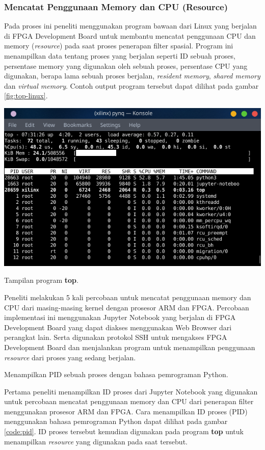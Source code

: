 \subsubsection{Mencatat Penggunaan Memory dan CPU (Resource)}
Pada proses ini peneliti menggunakan program bawaan dari Linux yang berjalan di FPGA Development Board untuk membantu mencatat penggunaan CPU dan memory (\textit{resource}) pada saat proses penerapan filter spasial. Program ini menampilkan data tentang proses yang berjalan seperti ID sebuah proses, persentase memory yang digunakan oleh sebuah proses, persentase CPU yang digunakan, berapa lama sebuah proses berjalan, \textit{resident memory}, \textit{shared memory} dan \textit{virtual memory}. Contoh output program tersebut dapat dilihat pada gambar \ref{fig:top-linux}.
\begin{afigure}
    \includegraphics[width=0.8\linewidth, center]{images/programs/top-linux.png}
    \caption{Tampilan program \textbf{top}.}
    \label{fig:top-linux}
\end{afigure}

Peneliti melakukan 5 kali percobaan untuk mencatat penggunaan memory dan CPU dari masing-masing kernel dengan prosesor ARM dan FPGA. Percobaan implementasi ini menggunakan Jupyter Notebook yang berjalan di FPGA Development Board yang dapat diakses menggunakan Web Browser dari perangkat lain. Serta digunakan protokol SSH untuk mengakses FPGA Development Board dan menjalankan program untuk menampilkan penggunaan \textit{resource} dari proses yang sedang berjalan.

\begin{afigure}
    
    \caption{Menampilkan PID sebuah proses dengan bahasa pemrograman Python.}
    \label{code:pid}
\end{afigure}

Pertama peneliti menampilkan ID proses dari Jupyter Notebook yang digunakan untuk percobaan mencatat penggunaan memory dan CPU dari penerapan filter menggunakan prosesor ARM dan FPGA. Cara menampilkan ID proses (PID) menggunakan bahasa pemrograman Python dapat dilihat pada gambar \ref{code:pid}. ID proses tersebut kemudian digunakan pada program \textbf{top} untuk menampilkan \textit{resource} yang digunakan pada saat tersebut. 

